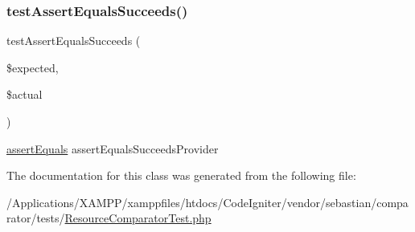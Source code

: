 \subsubsection{\texorpdfstring{test\+Assert\+Equals\+Succeeds()}{testAssertEqualsSucceeds()}}
{\footnotesize\ttfamily test\+Assert\+Equals\+Succeeds (\begin{DoxyParamCaption}\item[{}]{\$expected,  }\item[{}]{\$actual }\end{DoxyParamCaption})}

\mbox{\hyperlink{_functions_8php_a441ec5f09711b6271edda774132eec5f}{assert\+Equals}}  assert\+Equals\+Succeeds\+Provider 

The documentation for this class was generated from the following file\+:\begin{DoxyCompactItemize}
\item 
/\+Applications/\+X\+A\+M\+P\+P/xamppfiles/htdocs/\+Code\+Igniter/vendor/sebastian/comparator/tests/\mbox{\hyperlink{_resource_comparator_test_8php}{Resource\+Comparator\+Test.\+php}}\end{DoxyCompactItemize}
